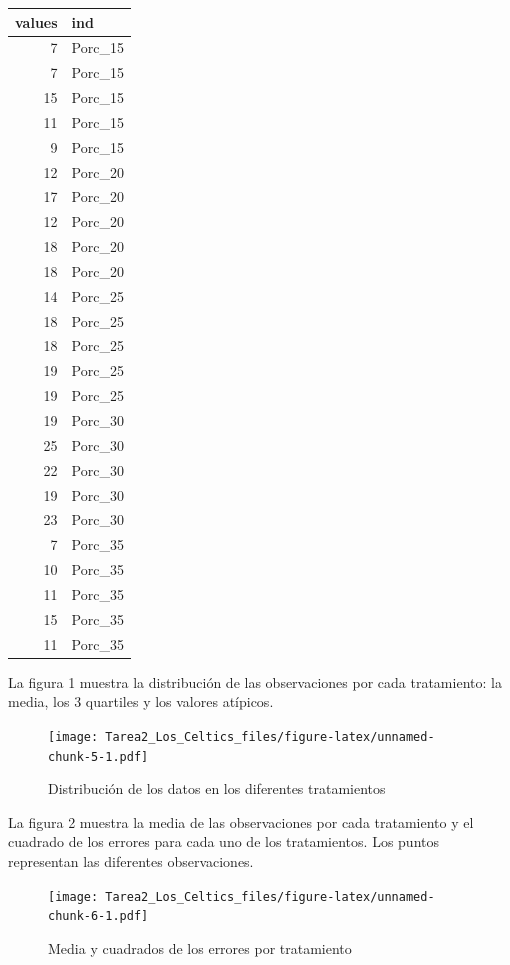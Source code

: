 \documentclass[]{article}
\begin{document}
\begin{tabular}{r|l}
\hline
values & ind\\
\hline
7 & Porc\_15\\
\hline
7 & Porc\_15\\
\hline
15 & Porc\_15\\
\hline
11 & Porc\_15\\
\hline
9 & Porc\_15\\
\hline
12 & Porc\_20\\
\hline
17 & Porc\_20\\
\hline
12 & Porc\_20\\
\hline
18 & Porc\_20\\
\hline
18 & Porc\_20\\
\hline
14 & Porc\_25\\
\hline
18 & Porc\_25\\
\hline
18 & Porc\_25\\
\hline
19 & Porc\_25\\
\hline
19 & Porc\_25\\
\hline
19 & Porc\_30\\
\hline
25 & Porc\_30\\
\hline
22 & Porc\_30\\
\hline
19 & Porc\_30\\
\hline
23 & Porc\_30\\
\hline
7 & Porc\_35\\
\hline
10 & Porc\_35\\
\hline
11 & Porc\_35\\
\hline
15 & Porc\_35\\
\hline
11 & Porc\_35\\
\hline
\end{tabular}

La figura 1 muestra la distribución de las observaciones por cada
tratamiento: la media, los 3 quartiles y los valores atípicos.

\begin{figure}
\centering
\texttt{[image: Tarea2\_Los\_Celtics\_files/figure-latex/unnamed-chunk-5-1.pdf]}
\caption{Distribución de los datos en los diferentes tratamientos}
\end{figure}

La figura 2 muestra la media de las observaciones por cada tratamiento y
el cuadrado de los errores para cada uno de los tratamientos. Los puntos
representan las diferentes observaciones.

\begin{figure}
\centering
\texttt{[image: Tarea2\_Los\_Celtics\_files/figure-latex/unnamed-chunk-6-1.pdf]}
\caption{Media y cuadrados de los errores por tratamiento}
\end{figure}
\end{document}
